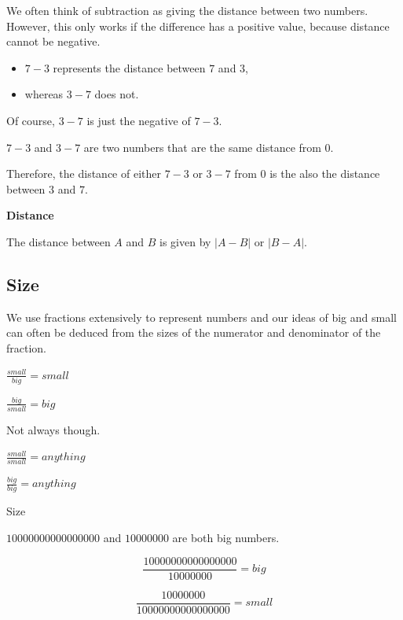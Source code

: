 \documentclass{ximera}
\begin{document}
We often think of subtraction as giving the distance between two numbers. However, this only works if the difference has a positive value, because distance cannot be negative.


\begin{itemize}
\item $7-3$ represents the distance between $7$ and $3$, 
\item whereas $3-7$ does not.
\end{itemize}

Of course, $3-7$ is just the negative of $7-3$. 


$7-3$ and $3-7$ are two numbers that are the same distance from $0$. 


 Therefore, the distance of either $7-3$ or $3-7$ from $0$ is the also the distance between $3$ and $7$.  


\begin{idea} \textbf{\textcolor{blue!55!black}{Distance}} 

The distance between $A$ and $B$ is given by $| A - B |$ or $| B - A |$.


\end{idea}







\subsection*{Size}

We use fractions extensively to represent numbers and our ideas of big and small can often be deduced from the sizes of the numerator and denominator of the fraction.



$\frac{small}{big} = small$



$\frac{big}{small} = big$



Not always though. 


$\frac{small}{small} = anything$


$\frac{big}{big} = anything$



\begin{example} Size



$10000000000000000$ and $10000000$ are both big numbers.



\[
\frac{10000000000000000}{10000000} = big
\]


\[
\frac{10000000}{10000000000000000} = small
\]


\end{example}
\end{document}
